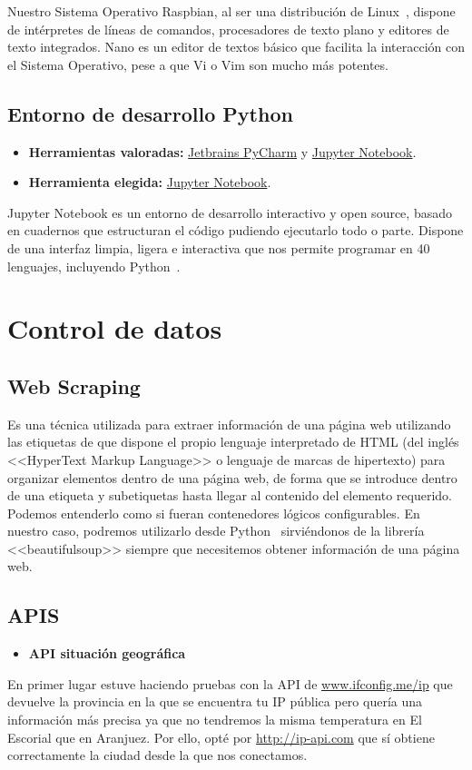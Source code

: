 Nuestro Sistema Operativo Raspbian\cite{misc:RbPWeb}, al ser una distribución de Linux~\cite{misc:Linux}, dispone de intérpretes de líneas de comandos, procesadores de texto plano y editores de texto integrados. Nano es un editor de textos básico que facilita la interacción con el Sistema Operativo, pese a que Vi o Vim son mucho más potentes.

\subsection{Entorno de desarrollo Python}\label{4:Python}
\begin{itemize}
    \item \textbf{Herramientas valoradas:} \href{https://www.jetbrains.com/es-es/pycharm/}{Jetbrains PyCharm} y \href{https://jupyter.org/}{Jupyter Notebook}.
    \item \textbf{Herramienta elegida:} \href{https://jupyter.org/}{Jupyter Notebook}.
\end{itemize}

Jupyter Notebook es un entorno de desarrollo interactivo y open source, basado en cuadernos que estructuran el código pudiendo ejecutarlo todo o parte. Dispone de una interfaz limpia, ligera e interactiva que nos permite programar en 40 lenguajes, incluyendo Python~\cite{misc:Python}.

\section{Control de datos}
\subsection{Web Scraping}\label{4:WebScraping}
Es una técnica utilizada para extraer información de una página web utilizando las etiquetas de que dispone el propio lenguaje interpretado de HTML (del inglés <<HyperText Markup Language>> o lenguaje de marcas de hipertexto) para organizar elementos dentro de una página web, de forma que se introduce dentro de una etiqueta y subetiquetas hasta llegar al contenido del elemento requerido. Podemos entenderlo como si fueran contenedores lógicos configurables.
En nuestro caso, podremos utilizarlo desde Python~\cite{misc:Python} sirviéndonos de la librería <<beautifulsoup>> siempre que necesitemos obtener información de una página web.

\subsection{APIS}\label{4:APIS}
\begin{itemize}
    \item \textbf{API situación geográfica}
\end{itemize}
En primer lugar estuve haciendo pruebas con la API de \url{www.ifconfig.me/ip} que devuelve la provincia en la que se encuentra tu IP pública pero quería una información más precisa ya que no tendremos la misma temperatura en El Escorial que en Aranjuez. Por ello, opté por \url{http://ip-api.com} que sí obtiene correctamente la ciudad desde la que nos conectamos.

